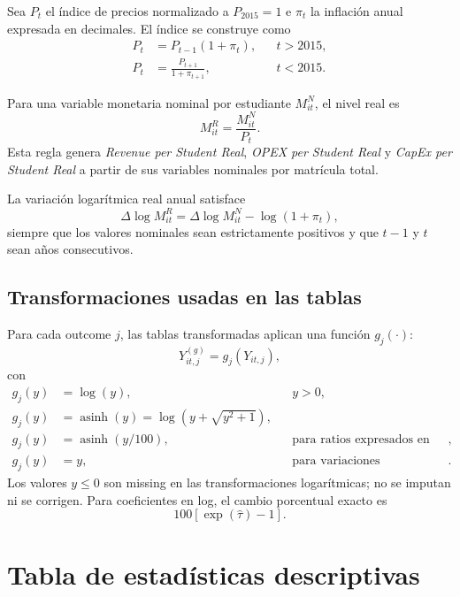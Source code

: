 \documentclass[11pt]{article}
\newcommand{\asinh}{\operatorname{asinh}}
\begin{document}
Sea $P_t$ el índice de precios normalizado a $P_{2015}=1$ e $\pi_t$ la inflación
anual expresada en decimales. El índice se construye como
\begin{align}
 P_t &= P_{t-1}(1+\pi_t), && t>2015, \\
 P_t &= \frac{P_{t+1}}{1+\pi_{t+1}}, && t<2015.
\end{align}

Para una variable monetaria nominal por estudiante $M^{N}_{it}$, el nivel real
es
\begin{equation}
 M^{R}_{it}=\frac{M^{N}_{it}}{P_t}.
\end{equation}
Esta regla genera \emph{Revenue per Student Real}, \emph{OPEX per Student Real}
y \emph{CapEx per Student Real} a partir de sus variables nominales por
matrícula total.

La variación logarítmica real anual satisface
\begin{equation}
 \Delta\log M^{R}_{it}
 =\Delta\log M^{N}_{it}-\log(1+\pi_t),
\end{equation}
siempre que los valores nominales sean estrictamente positivos y que $t-1$ y
$t$ sean años consecutivos.

\subsection{Transformaciones usadas en las tablas}

Para cada outcome $j$, las tablas transformadas aplican una función $g_j(\cdot)$:
\begin{equation}
 Y^{(g)}_{it,j}=g_j(Y_{it,j}),
\end{equation}
con
\begin{align}
 g_j(y)&=\log(y), && y>0, \\
 g_j(y)&=\asinh(y)=\log\!\left(y+\sqrt{y^2+1}\right), \\
 g_j(y)&=\asinh(y/100), && \text{para ratios expresados en porcentaje}, \\
 g_j(y)&=y, && \text{para variaciones logarítmicas reales ya construidas}.
\end{align}
Los valores $y\leq 0$ son missing en las transformaciones logarítmicas; no se
imputan ni se corrigen. Para coeficientes en log, el cambio porcentual exacto es
\begin{equation}
 100\left[\exp(\widehat\tau)-1\right].
\end{equation}

\section{Tabla de estadísticas descriptivas}
\end{document}
